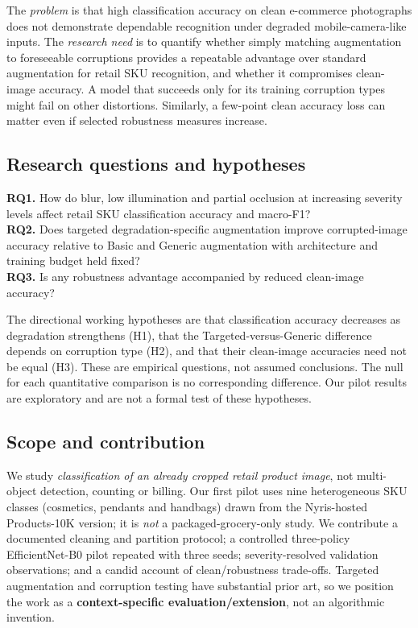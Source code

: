 \documentclass[sigconf,nonacm]{acmart}
\begin{document}
The \emph{problem} is that high classification accuracy on clean e-commerce photographs does not demonstrate dependable recognition under degraded mobile-camera-like inputs. The \emph{research need} is to quantify whether simply matching augmentation to foreseeable corruptions provides a repeatable advantage over standard augmentation for retail SKU recognition, and whether it compromises clean-image accuracy. A model that succeeds only for its training corruption types might fail on other distortions. Similarly, a few-point clean accuracy loss can matter even if selected robustness measures increase.

\subsection{Research questions and hypotheses}
\textbf{RQ1.} How do blur, low illumination and partial occlusion at increasing severity levels affect retail SKU classification accuracy and macro-F1?\\
\textbf{RQ2.} Does targeted degradation-specific augmentation improve corrupted-image accuracy relative to Basic and Generic augmentation with architecture and training budget held fixed?\\
\textbf{RQ3.} Is any robustness advantage accompanied by reduced clean-image accuracy?

The directional working hypotheses are that classification accuracy decreases as degradation strengthens (H1), that the Targeted-versus-Generic difference depends on corruption type (H2), and that their clean-image accuracies need not be equal (H3). These are empirical questions, not assumed conclusions. The null for each quantitative comparison is no corresponding difference. Our pilot results are exploratory and are not a formal test of these hypotheses.

\subsection{Scope and contribution}
We study \emph{classification of an already cropped retail product image}, not multi-object detection, counting or billing. Our first pilot uses nine heterogeneous SKU classes (cosmetics, pendants and handbags) drawn from the Nyris-hosted Products-10K version; it is \emph{not} a packaged-grocery-only study. We contribute a documented cleaning and partition protocol; a controlled three-policy EfficientNet-B0 pilot repeated with three seeds; severity-resolved validation observations; and a candid account of clean/robustness trade-offs. Targeted augmentation and corruption testing have substantial prior art, so we position the work as a \textbf{context-specific evaluation/extension}, not an algorithmic invention.
\end{document}
